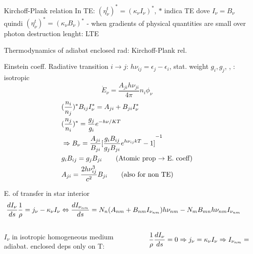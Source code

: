 \begin{frame}{Kirchoff-Plank relation}
    In TE: $(\eta_{\nu}^t)^*=(\kappa_{\nu}I_{\nu})^*$, $*$ indica TE dove $I_{\nu}=B_{\nu}$ quindi $(\eta_{\nu}^t)^*=(\kappa_{\nu}B_{\nu})^*$ - when gradients of physical quantities are small over photon destruction lenght: LTE
\end{frame}

\begin{frame}{Thermodynamics of adiabat enclosed rad: Kirchoff-Plank rel.}
    \begin{block}{Einstein coeff.}
Radiative transition $i\to j$: $h\nu_{ij}=\epsilon_j-\epsilon_i$, stat. weight $g_i, g_j$, , : isotropic
            \[\dot{E}_{\nu}=\frac{A_{ji}h\nu_{ji}}{4\pi}n_i\phi_{\nu}\]
            \begin{align*}
                &(\frac{n_i}{n_j})^*B_{ij}I_{\nu}^*=A_{ji}+B_{ji}I_{\nu}^*\label{CR and TE}\\
                &(\frac{n_j}{n_i})^*=\frac{g_j}{g_i}\exp{-h\nu/KT}\\
                &\Rightarrow B_{\nu}=\frac{A_{ji}}{B_{ji}}\invers{[\frac{g_iB_{ij}}{g_jB_{ji}}\exp{h\nu_{ij}kT}-1]}\\
                &g_iB_{ij}=g_jB_{ji}\tag{Atomic prop $\to$ E. coeff}\\
                &A_{ji}=\frac{2h\nu_{ij}^3}{c^2}B_{ji}\tag{also for non TE}
            \end{align*}
   \end{block}
   \begin{block}{E. of transfer in star interior}
       \begin{align}
        &\TDy{s}{I_{\nu}}\frac{1}{\rho}=j_{\nu}-\kappa_{\nu}I_{\nu}\Leftrightarrow\TDy{s}{I_{\nu_{nm}}}=N_n(A_{nm}+B_{nm}I_{\nu_{nm}})h\nu_{nm}-N_mB_{mn}h\nu_{nm}I_{\nu_{nm}}\label{ERT}
    \end{align}
    \begin{columns}[T]
        \begin{column}{0.3\textwidth}
            $I_{\nu}$ in isotropic homogeneous medium adiabat. enclosed deps only on T:
        \end{column}
        \begin{column}{0.7\textwidth}
        \begin{align*}
        \frac{1}{\rho}\TDy{s}{I_{\nu}}=0\Rightarrow j_{\nu}=\kappa_{\nu}I_{\nu}\Rightarrow I_{\nu_{nm}}=\frac{N_nA_{nm}}{N_mB_{mn}-N_nB_{nm}}\label{Kirckoff-Plank}
\end{align*}
        \end{column}
    \end{columns} 
   \end{block}
\end{frame}
